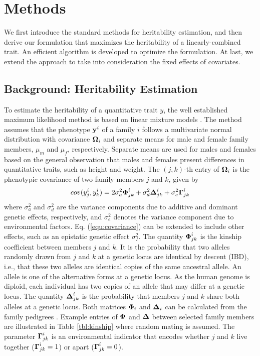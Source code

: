 \documentclass[10pt,letterpaper]{article}
\newcommand{\matrx}[1]{\ensuremath\boldsymbol{\rm #1}}
\newcommand{\vect}[1]{\ensuremath\boldsymbol{\rm #1}}
\begin{document}
\section*{Methods}
We first introduce the standard methods for heritability estimation, and then derive our formulation that maximizes the heritability of a linearly-combined trait. An efficient algorithm is developed to optimize the formulation. At last, we extend the approach to take into consideration the fixed effects of covariates.
\subsection*{Background: Heritability Estimation}
\label{sec:background}
To estimate the heritability of a quantitative trait $y$, the well established maximum likelihood method is based on linear mixture models \cite{Lange1976,Balding2007}. The method assumes that the phenotype $\vect y^i$ of a family $i$ follows a multivariate normal distribution with covariance $\matrx \Omega_i$ and separate means for male and female family members, $\mu_m$ and $\mu_f$, respectively. Separate means are used for males and females based on the general observation that males and females present differences in quantitative traits, such as height and weight. The $(j,k)$-th entry of $\matrx \Omega_i$ is the phenotypic covariance of two family members $j$ and $k$,  given by 
\begin{equation}
\label{equ:covariance}
cov(y^i_j, y^i_k)=2\sigma_a^2\matrx \Phi_{jk}^i + \sigma_d^2\matrx \Delta_{jk}^i + \sigma_e^2\matrx \Gamma_{jk}^i
\end{equation}
where $\sigma_a^2$ and $\sigma_d^2$ are the variance components due to additive and dominant genetic effects, respectively, and $\sigma_e^2$ denotes the variance component due to environmental factors. Eq. (\ref{equ:covariance}) can be extended to include other effects, such as an epistatic genetic effect $\sigma_I^2$. The quantity $\matrx \Phi_{jk}^i$ is the kinship coefficient between members $j$ and $k$. It is the probability that two alleles randomly drawn from $j$ and $k$ at a genetic locus are identical by descent (IBD), i.e., that these two alleles are identical copies of the same ancestral allele. An allele is one of the alternative forms at a genetic locus. As the human genome is diploid, each individual has two copies of an allele that may differ at a genetic locus. The quantity $\matrx \Delta_{jk}^i$ is the probability that members $j$ and $k$ share both alleles at a genetic locus. Both matrices $\matrx \Phi_i$ and $\matrx \Delta_i$ can be calculated from the family pedigrees \cite{Balding2007}. Example entries of $\matrx \Phi$ and $\matrx \Delta$ between selected family members  are illustrated in Table \ref{tbl:kinship} where random mating is assumed. The parameter $\matrx \Gamma_{jk}^i$ is an environmental indicator that encodes whether $j$ and $k$ live together ($\matrx \Gamma_{jk}^i=1$) or apart ($\matrx \Gamma_{jk}^i=0$). 
\end{document}
